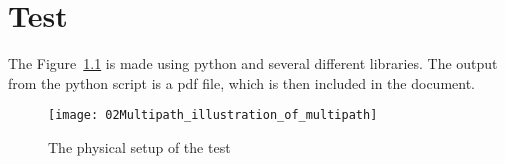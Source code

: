 \chapter{Test}\label{sec:Test}

The Figure~\ref{fig:physical_setup} is made using python and several different libraries.
The output from the python script is a pdf file, which is then included in the document.
\begin{figure}[H]
    \centering
    \texttt{[image: 02Multipath\_illustration\_of\_multipath]}
    \caption{The physical setup of the test}
    \label{fig:physical_setup}
\end{figure}